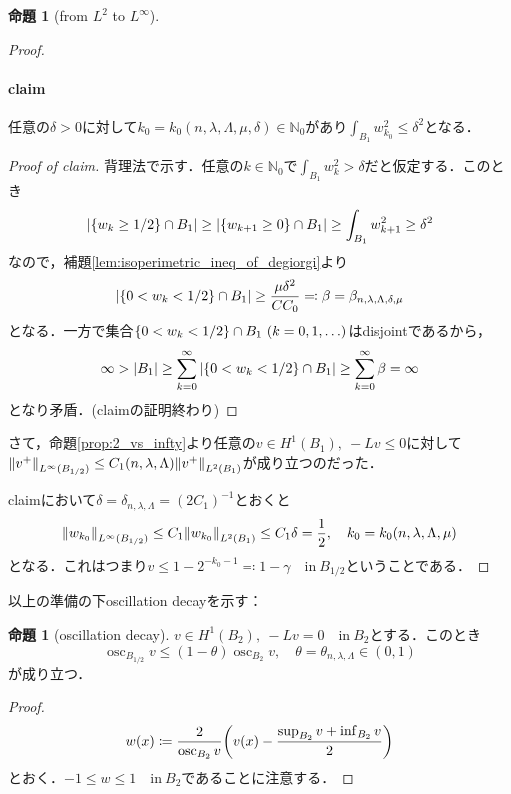 \documentclass[a4paper]{ltjsarticle}
\newcommand{\Nset}{\mathbb{N}}
\newcommand{\inn}{\quad\text{in}\ }
\newcommand{\1}{\mathbbm{1}}
\DeclareMathOperator*{\osc}{\mathrm{osc}}
\numberwithin{equation}{section}
\theoremstyle{definition}
\newtheorem{prop}[thm]{命題}
\begin{document}
\begin{prop}[from $L^2$ to $L^\infty$]
\begin{proof}
    \paragraph{claim}任意の$\delta>0$に対して$k_0=k_0(n,\lambda,\Lambda,\mu,\delta)\in\Nset_0$があり$\int_{B_1}w_{k_0}^2\leq \delta^2$となる．
    \begin{proof}[Proof of claim]
        背理法で示す．任意の$k\in\Nset_0$で$\int_{B_1}w_{k}^2>\delta$だと仮定する．このとき
        \begin{equation}
            \abs{\qty{w_k\geq1/2}\cap B_1}\geq \abs{\qty{w_{k+1}\geq0}\cap B_1}\geq \int_{B_1}w_{k+1}^2\geq\delta^2 
        \end{equation}
        なので，補題\ref{lem:isoperimetric_ineq_of_degiorgi}より
        \begin{equation}
            \abs{\qty{0<w_k<1/2}\cap B_1}\geq \frac{\mu\delta^2}{CC_0}\eqqcolon \beta=\beta_{n,\lambda,\Lambda,\delta,\mu}
        \end{equation}
        となる．一方で集合$\qty{0<w_k<1/2}\cap B_1\ (k=0,1,\ldots)$はdisjointであるから，
        \begin{equation}
            \infty>\abs{B_1}\geq \sum_{k=0}^{\infty}\abs{\qty{0<w_k<1/2}\cap B_1}\geq \sum_{k=0}^{\infty}\beta=\infty
        \end{equation}
        となり矛盾．(claimの証明終わり)
    \end{proof}
    さて，命題\ref{prop:2_vs_infty}より任意の$v\in H^1(B_1),\ -Lv\leq 0$に対して$\norm{v^+}_{L^\infty(B_{1/2})}\leq C_1(n,\lambda,\Lambda)\norm{v^+}_{L^2(B_1)}$が成り立つのだった．

    claimにおいて$\delta=\delta_{n,\lambda,\Lambda}=(2C_1)^{-1}$とおくと
    \begin{equation}
        \norm{w_{k_0}}_{L^\infty(B_{1/2})}\leq C_1\norm{w_{k_0}}_{L^2(B_1)}\leq C_1\delta= \frac{1}{2},\quad k_0=k_0(n,\lambda,\Lambda,\mu) 
    \end{equation}
    となる．これはつまり$v\leq 1-2^{-k_0-1}\eqqcolon 1-\gamma\inn B_{1/2}$ということである．
\end{proof}
以上の準備の下oscillation decayを示す：
\begin{prop}[oscillation decay]
    $v\in H^1(B_2),\ -Lv=0\inn B_2$とする．このとき
    \begin{equation}
        \osc_{B_{1/2}}v\leq (1-\theta)\osc_{B_2}v,\quad \theta=\theta_{n,\lambda,\Lambda}\in (0,1) 
    \end{equation}
    が成り立つ．
\end{prop}
\begin{proof}
    \begin{equation}
        w(x)\coloneqq \frac{2}{\osc_{B_2}v}\qty(v(x)-\frac{\sup_{B_2}v+\inf_{B_2}v}{2}) 
    \end{equation}
    とおく．$-1\leq w\leq 1\inn B_2$であることに注意する．


\end{proof}
\end{prop}
\end{document}

